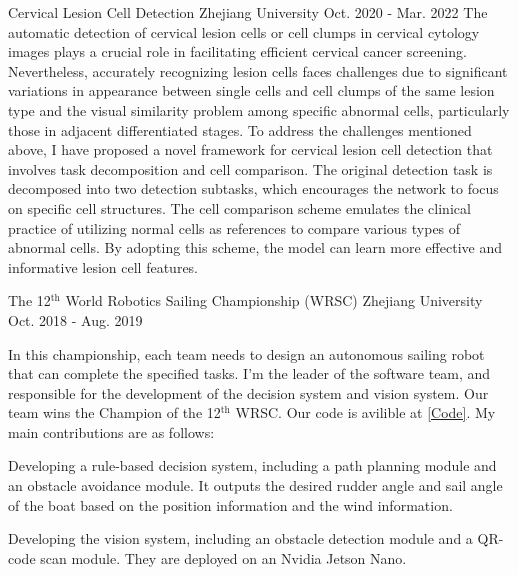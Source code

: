 \begin{cventries}
	\cventry
	{} %
	{Cervical Lesion Cell Detection} %
	{Zhejiang University} %
	{Oct. 2020 - Mar. 2022} %
	{
		\quad The automatic detection of cervical lesion cells or cell clumps in cervical cytology images plays a crucial role in facilitating efficient cervical cancer screening. Nevertheless, accurately recognizing lesion cells faces challenges due to significant variations in appearance between single cells and cell clumps of the same lesion type and the visual similarity problem among specific abnormal cells, particularly those in adjacent differentiated stages. \newline
		\quad To address the challenges mentioned above, I have proposed a novel framework for cervical lesion cell detection that involves task decomposition and cell comparison. The original detection task is decomposed into two detection subtasks, which encourages the network to focus on specific cell structures. The cell comparison scheme emulates the clinical practice of utilizing normal cells as references to compare various types of abnormal cells. By adopting this scheme, the model can learn more effective and informative lesion cell features. \newline
		\vspace{-3.5mm}
	}

	\cventry
	{} %
	{The 12$^\text{th}$ World Robotics Sailing Championship (WRSC)} %
	{Zhejiang University} %
	{Oct. 2018 - Aug. 2019} %
	{
		\quad In this championship, each team needs to design an autonomous sailing robot that can complete the specified tasks. I'm the leader of the software team, and responsible for the development of the decision system and vision system. Our team wins the Champion of the 12$^\text{th}$ WRSC. Our code is avilible at \href{https://github.com/ZMART-Sailing/sailing_robot}{\textcolor{link}{[Code]}}.\newline
		My main contributions are as follows: \newline
		\vspace{3.5mm}
		\begin{cvitems} %
			\item{Developing a rule-based decision system, including a path planning module and an obstacle avoidance module. It outputs the desired rudder angle and sail angle of the boat based on the position information and the wind information.}
			\item{Developing the vision system, including an obstacle detection module and a QR-code scan module. They are deployed on an Nvidia Jetson Nano.}
		\end{cvitems}
	}


\end{cventries}
